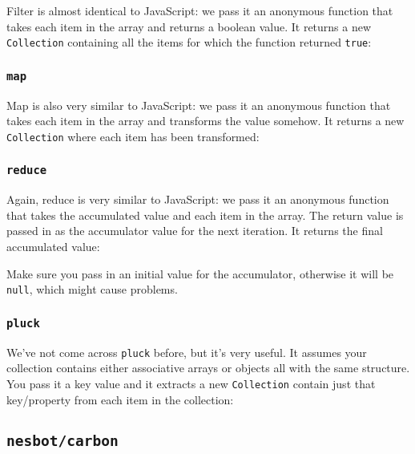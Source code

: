 Filter is almost identical to JavaScript: we pass it an anonymous function that takes each item in the array and returns a boolean value. It returns a new \texttt{Collection} containing all the items for which the function returned \texttt{true}:


\subsubsection{\texttt{map}}

Map is also very similar to JavaScript: we pass it an anonymous function that takes each item in the array and transforms the value somehow. It returns a new \texttt{Collection} where each item has been transformed:


\subsubsection{\texttt{reduce}}

Again, reduce is very similar to JavaScript: we pass it an anonymous function that takes the accumulated value and each item in the array. The return value is passed in as the accumulator value for the next iteration. It returns the final accumulated value:


Make sure you pass in an initial value for the accumulator, otherwise it will be \texttt{null}, which might cause problems.

\subsubsection{\texttt{pluck}}

We've not come across \texttt{pluck} before, but it's very useful. It assumes your collection contains either associative arrays or objects all with the same structure. You pass it a key value and it extracts a new \texttt{Collection} contain just that key/property from each item in the collection:




\subsection{\texttt{nesbot/carbon}}

